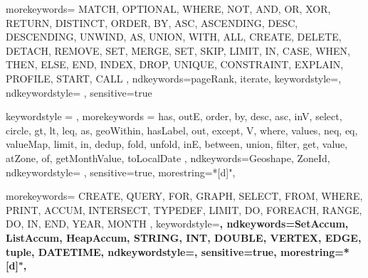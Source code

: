 \lstset{upquote=true}


{
    morekeywords={
		MATCH, OPTIONAL, WHERE, NOT, AND, OR, XOR, RETURN, DISTINCT, ORDER, BY, ASC, ASCENDING, DESC, DESCENDING, UNWIND, AS, UNION, WITH, ALL, CREATE, DELETE, DETACH, REMOVE, SET, MERGE, SET, SKIP, LIMIT, IN, CASE, WHEN, THEN, ELSE, END, INDEX, DROP, UNIQUE, CONSTRAINT, EXPLAIN, PROFILE, START, CALL
	},
    ndkeywords={pageRank, iterate},
    keywordstyle={\color{keyword}\bfseries},
    ndkeywordstyle= {\color{relation}},
    sensitive=true
}


{
    keywordstyle = {\color{keyword}},
    morekeywords = {
        has, outE, order, by, desc, asc, inV, select, circle, gt, lt, leq, as, geoWithin, hasLabel, out, except, V, where, values, neq, eq, valueMap, limit, in, dedup, fold, unfold, inE, between, union, filter, get, value, atZone, of, getMonthValue, toLocalDate
    },
    ndkeywords={Geoshape, ZoneId},
    ndkeywordstyle= {\color{relation}},
    sensitive=true,
    morestring=*[d]{"},
}


{
	morekeywords={
		CREATE, QUERY, FOR, GRAPH, SELECT, FROM, WHERE, PRINT, ACCUM, INTERSECT, TYPEDEF, LIMIT, DO, FOREACH, RANGE, DO, IN, END, YEAR, MONTH
	},
	keywordstyle=\color{keyword}\bfseries,
	ndkeywords={SetAccum, ListAccum, HeapAccum, STRING, INT, DOUBLE, VERTEX, EDGE, tuple, DATETIME},
    ndkeywordstyle=\color{relation},
    sensitive=true,
    morestring=*[d]{"},
}